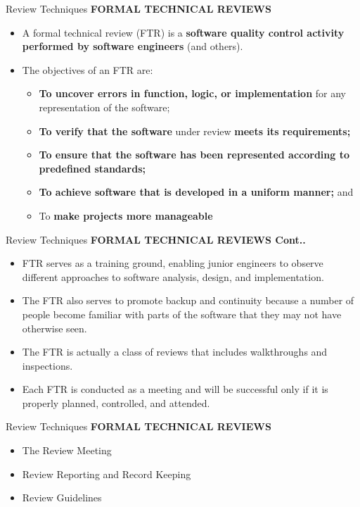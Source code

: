 \documentclass{beamer}
\begin{document}
\begin{frame}{Review Techniques}
	\textbf{FORMAL TECHNICAL REVIEWS}
	\begin{itemize}
		\item  A formal technical review (FTR) is a \textbf{software quality control activity performed by software engineers }(and others).
		\item The objectives of an FTR are:
		\begin{itemize}
			\item \textbf{To uncover errors in function, logic, or implementation} for any 
			representation of the software;
			\item \textbf{To verify that the software} under review \textbf{meets its requirements; }
			\item  \textbf{To ensure that the software has been represented according to predefined 
				standards;}
			\item \textbf{To achieve software that is developed in a uniform manner;} and
			\item To\textbf{ make projects more manageable}
		\end{itemize}
	\end{itemize}
\end{frame}

\begin{frame}{Review Techniques}
	\textbf{FORMAL TECHNICAL REVIEWS Cont..}
	\begin{itemize}
		\item FTR serves as a training ground, enabling junior engineers to observe 
		different approaches to software analysis, design, and implementation.
		\item The FTR also serves to promote backup and continuity because a 
		number of people become familiar with parts of the software that they 
		may not have otherwise seen.
		\item The FTR is actually a class of reviews that includes walkthroughs and 
		inspections.
		\item Each FTR is conducted as a meeting and will be successful only if it is 
		properly planned, controlled, and attended.
	\end{itemize}
\end{frame}
\begin{frame}{Review Techniques}
\textbf{FORMAL TECHNICAL REVIEWS}
\begin{itemize}
	\item The Review Meeting
	\item Review Reporting and Record Keeping
	\item Review Guidelines
\end{itemize}
\end{frame}
\end{document}
